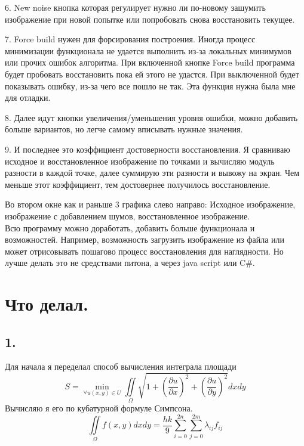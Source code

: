 \documentclass{report}
\newcommand{\ttt}{\hspace*{4mm}}
\begin{document}
\item 6. New noise кнопка которая регулирует нужно ли по-новому зашумить изображение при новой попытке или попробовать снова восстановить текущее.
\item 7. Force build нужен для форсирования построения. Иногда процесс минимизации функционала не удается выполнить из-за локальных минимумов или прочих ошибок алгоритма. При включенной кнопке Force build программа будет пробовать восстановить пока ей этого не удастся. При выключенной будет показывать ошибку, из-за чего все пошло не так. Эта функция нужна была мне для отладки. 
\item 8. Далее идут кнопки увеличения/уменьшения уровня ошибки, можно добавить больше вариантов, но легче самому вписывать нужные значения. 
\item 9. И последнее это коэффициент достоверности восстановления. Я сравниваю исходное и восстановленное изображение по точками и вычисляю модуль разности в каждой точке, далее суммирую эти разности и вывожу на экран. Чем меньше этот коэффициент, тем достовернее получилось восстановление. 

\ttt
Во втором окне как и раньше 3 графика слево направо: Исходное изображение, изображение с добавлением шумов, восстановленное изображение. 
\\
\ttt 
Всю программу можно доработать, добавить больше функционала и возможностей. Например, возможность загрузить изображение из файла или может отрисовывать пошагово процесс восстановления для наглядности. Но лучше делать это не средствами питона, а через java script или C{\lserif\#}.
\section*{Что делал.}
\subsection*{1.}
Для начала я переделал способ вычисления интеграла площади 
$$S = \min_{\forall u(x, y) \in U} \iint\limits_\Omega \sqrt{1+(\frac{\partial u}{\partial x})^2 + (\frac{\partial u}{\partial y})^2}dxdy $$
Вычисляю я его по кубатурной формуле Симпсона. 
$$ \iint\limits_\Omega f(x,y)dxdy = \frac{hk}{9} \sum_{i=0}^{2n} \sum_{j=0}^{2m}\lambda_{ij} f_{ij}$$
\newpage
\end{document}
